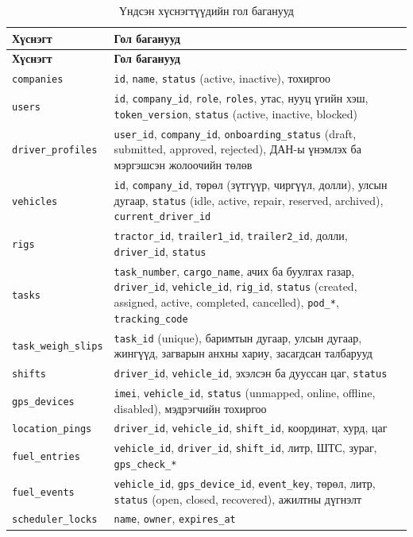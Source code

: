 \documentclass[
12pt,
oneside,
english,
onehalfspacing,
nolistspacing,
headsepline,
]{MUST-Thesis}
\begin{document}
{\small
\renewcommand{\arraystretch}{1.15}
\begin{longtable}{|L{3.4cm}|L{10.4cm}|}
\caption{Үндсэн хүснэгтүүдийн гол баганууд}\label{tab:app-columns}\\
\hline
{}\textbf{Хүснэгт} & \textbf{Гол баганууд} \\ \hline
\endfirsthead
\hline
{}\textbf{Хүснэгт} & \textbf{Гол баганууд} \\ \hline
\endhead
\texttt{companies} & \texttt{id}, \texttt{name}, \texttt{status} (active, inactive), тохиргоо \\ \hline
\texttt{users} & \texttt{id}, \texttt{company\_id}, \texttt{role}, \texttt{roles}, утас, нууц үгийн хэш, \texttt{token\_version}, \texttt{status} (active, inactive, blocked) \\ \hline
\texttt{driver\_profiles} & \texttt{user\_id}, \texttt{company\_id}, \texttt{onboarding\_status} (draft, submitted, approved, rejected), ДАН-ы үнэмлэх ба мэргэшсэн жолоочийн төлөв \\ \hline
\texttt{vehicles} & \texttt{id}, \texttt{company\_id}, төрөл (зүтгүүр, чиргүүл, долли), улсын дугаар, \texttt{status} (idle, active, repair, reserved, archived), \texttt{current\_driver\_id} \\ \hline
\texttt{rigs} & \texttt{tractor\_id}, \texttt{trailer1\_id}, \texttt{trailer2\_id}, долли, \texttt{driver\_id}, \texttt{status} \\ \hline
\texttt{tasks} & \texttt{task\_number}, \texttt{cargo\_name}, ачих ба буулгах газар, \texttt{driver\_id}, \texttt{vehicle\_id}, \texttt{rig\_id}, \texttt{status} (created, assigned, active, completed, cancelled), \texttt{pod\_*}, \texttt{tracking\_code} \\ \hline
\texttt{task\_weigh\_slips} & \texttt{task\_id} (unique), баримтын дугаар, улсын дугаар, жингүүд, загварын анхны хариу, засагдсан талбарууд \\ \hline
\texttt{shifts} & \texttt{driver\_id}, \texttt{vehicle\_id}, эхэлсэн ба дууссан цаг, \texttt{status} \\ \hline
\texttt{gps\_devices} & \texttt{imei}, \texttt{vehicle\_id}, \texttt{status} (unmapped, online, offline, disabled), мэдрэгчийн тохиргоо \\ \hline
\texttt{location\_pings} & \texttt{driver\_id}, \texttt{vehicle\_id}, \texttt{shift\_id}, координат, хурд, цаг \\ \hline
\texttt{fuel\_entries} & \texttt{vehicle\_id}, \texttt{driver\_id}, \texttt{shift\_id}, литр, ШТС, зураг, \texttt{gps\_check\_*} \\ \hline
\texttt{fuel\_events} & \texttt{vehicle\_id}, \texttt{gps\_device\_id}, \texttt{event\_key}, төрөл, литр, \texttt{status} (open, closed, recovered), ажилтны дүгнэлт \\ \hline
\texttt{scheduler\_locks} & \texttt{name}, \texttt{owner}, \texttt{expires\_at} \\ \hline
\end{longtable}
}
\end{document}
